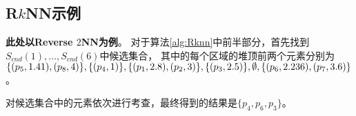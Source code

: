 \documentclass{ML}
\def\n{2} %
\def\maxxy{6} %
\begin{document}
\subsection{R$k$NN示例}
\textbf{此处以Reverse $2$NN为例}。
对于算法\ref{alg:Rknn}中前半部分，首先找到$S_{cnd}(1), \dots, S_{cnd}(6)$中候选集合，
其中的每个区域的堆顶前两个元素分别为$\{(p_5, 1.41), (p_8, 4)\}, \{(p_4, 1)\}, \{(p_1, 2.8), (p_2, 3)\},\\
\{(p_3, 2.5)\}, \emptyset, \{(p_6, 2.236), (p_7, 3.6)\}$。

对候选集合中的元素依次进行考查，最终得到的结果是$\{p_4, p_6, p_3\}$。
\begin{figure}[H]
  \centering
\end{figure}
\end{document}
